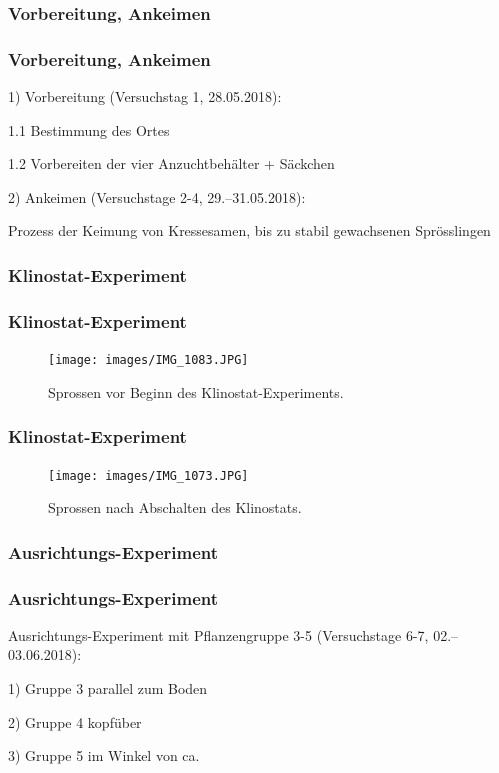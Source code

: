 \documentclass[aspectratio=169]{beamer}
\begin{document}
	\subsubsection{Vorbereitung, Ankeimen}
	
	\begin{frame}
		\frametitle{Vorbereitung, Ankeimen}
		1) Vorbereitung (Versuchstag 1, 28.05.2018):
		
	 	1.1 Bestimmung des Ortes
			
		1.2 Vorbereiten der vier Anzuchtbehälter + Säckchen 
			
		2) Ankeimen (Versuchstage 2-4, 29.–31.05.2018):
		
		Prozess der Keimung von Kressesamen, bis zu stabil gewachsenen Sprösslingen
				
		
	\end{frame}
	
	\subsubsection{Klinostat-Experiment}
	
	\begin{frame}
		\frametitle{Klinostat-Experiment}
		
	\begin{figure}[H]
	\centering
	\texttt{[image: images/IMG\_1083.JPG]}
	\caption{Sprossen vor Beginn des Klinostat-Experiments.\label{Foto 1}}	
	\end{figure}	
	
	\end{frame}

\begin{frame}
\frametitle{Klinostat-Experiment}

\begin{figure}[H]
	\centering		 \texttt{[image: images/IMG\_1073.JPG]}	\caption{Sprossen nach Abschalten des Klinostats.\label{Foto 2}}
	
\end{figure}

\end{frame}


	\subsubsection{Ausrichtungs-Experiment}
	
	\begin{frame}
		\frametitle{Ausrichtungs-Experiment}
	Ausrichtungs-Experiment mit Pflanzengruppe 3-5 (Versuchstage 6-7, 02.–03.06.2018):
	
	1) Gruppe 3 parallel zum Boden
	
	2) Gruppe 4 kopfüber
	
	3) Gruppe 5 im Winkel von ca. %
	
\end{frame}
	
\end{document}

